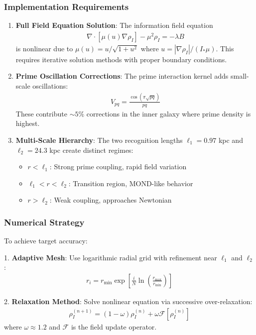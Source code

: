 \documentclass[12pt]{article}
\begin{document}
\subsubsection{Implementation Requirements}

\begin{enumerate}
\item \textbf{Full Field Equation Solution}: The information field equation
\begin{align}
\nabla \cdot [\mu(u)\nabla\rho_I] - \mu^2 \rho_I = -\lambda B
\end{align}
is nonlinear due to $\mu(u) = u/\sqrt{1+u^2}$ where $u = |\nabla\rho_I|/(I_*\mu)$. This requires iterative solution methods with proper boundary conditions.

\item \textbf{Prime Oscillation Corrections}: The prime interaction kernel adds small-scale oscillations:
\begin{align}
V_{pq} = \frac{\cos(\pi\sqrt{pq})}{pq}
\end{align}
These contribute $\sim 5\%$ corrections in the inner galaxy where prime density is highest.

\item \textbf{Multi-Scale Hierarchy}: The two recognition lengths $\ell_1 = 0.97$ kpc and $\ell_2 = 24.3$ kpc create distinct regimes:
\begin{itemize}
\item $r < \ell_1$: Strong prime coupling, rapid field variation
\item $\ell_1 < r < \ell_2$: Transition region, MOND-like behavior
\item $r > \ell_2$: Weak coupling, approaches Newtonian
\end{itemize}
\end{enumerate}

\subsubsection{Numerical Strategy}

To achieve target accuracy:

1. \textbf{Adaptive Mesh}: Use logarithmic radial grid with refinement near $\ell_1$ and $\ell_2$:
\begin{align}
r_i = r_{\min} \exp\left[\frac{i}{N}\ln\left(\frac{r_{\max}}{r_{\min}}\right)\right]
\end{align}

2. \textbf{Relaxation Method}: Solve nonlinear equation via successive over-relaxation:
\begin{align}
\rho_I^{(n+1)} = (1-\omega)\rho_I^{(n)} + \omega \mathcal{F}[\rho_I^{(n)}]
\end{align}
where $\omega \approx 1.2$ and $\mathcal{F}$ is the field update operator.
\end{document}
